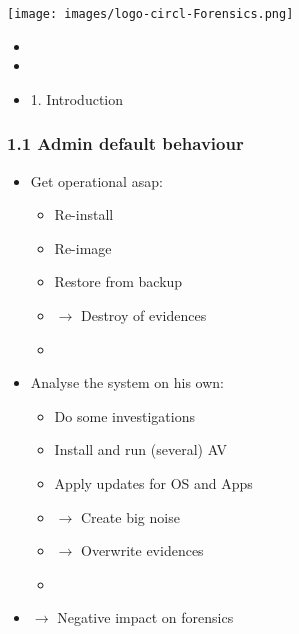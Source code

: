 %
%



\begin{frame}
    \texttt{[image: images/logo-circl-Forensics.png]}
    \begin{itemize}
        \item[]
        \item[]
        \item[] 1. Introduction
    \end{itemize}
\end{frame}


\begin{frame}
  \frametitle{1.1 Admin default behaviour}
  \begin{itemize}
    \item Get operational asap:
    \begin{itemize}
      \item Re-install
      \item Re-image
      \item Restore from backup
      \item[] $\to$ Destroy of evidences
      \item[]
    \end{itemize}
    \item Analyse the system on his own:
    \begin{itemize}
      \item Do some investigations
      \item Install and run (several) AV
      \item Apply updates for OS and Apps
      \item[] $\to$ Create big noise
      \item[] $\to$ Overwrite evidences
      \item[]
    \end{itemize}
    \item[] $\to$ Negative impact on forensics
  \end{itemize}
\end{frame}


